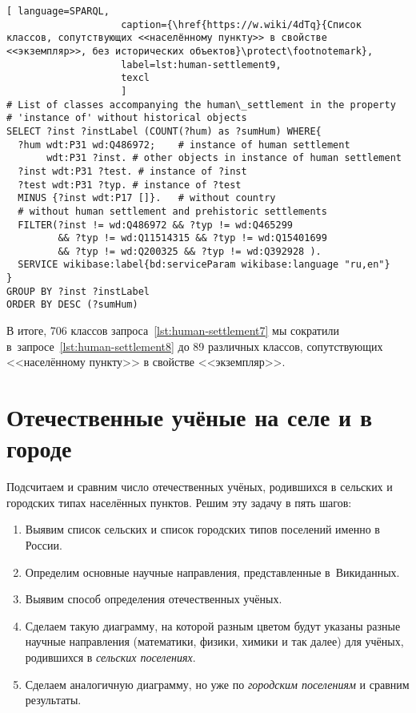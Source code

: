 \lstset{numbers=left, firstnumber=1, frame=single}
\begin{lstlisting}[ language=SPARQL, 
                    caption={\href{https://w.wiki/4dTq}{Cписок классов, сопутствующих <<населённому пункту>> в свойстве <<экземпляр>>, без исторических объектов}\protect\footnotemark},
                    label=lst:human-settlement9,
                    texcl 
                    ]
# List of classes accompanying the human\_settlement in the property
# 'instance of' without historical objects 
SELECT ?inst ?instLabel (COUNT(?hum) as ?sumHum) WHERE{
  ?hum wdt:P31 wd:Q486972;    # instance of human settlement
       wdt:P31 ?inst. # other objects in instance of human settlement
  ?inst wdt:P31 ?test. # instance of ?inst
  ?test wdt:P31 ?typ. # instance of ?test
  MINUS {?inst wdt:P17 []}.   # without country
  # without human settlement and prehistoric settlements
  FILTER(?inst != wd:Q486972 && ?typ != wd:Q465299 
         && ?typ != wd:Q11514315 && ?typ != wd:Q15401699 
         && ?typ != wd:Q200325 && ?typ != wd:Q392928 ). 
  SERVICE wikibase:label{bd:serviceParam wikibase:language "ru,en"}
}
GROUP BY ?inst ?instLabel
ORDER BY DESC (?sumHum)
\end{lstlisting}%

В итоге, 706 классов запроса~\ref{lst:human-settlement7} 
мы сократили в~запросе~\ref{lst:human-settlement8} 
до 89 различных классов, сопутствующих <<населённому пункту>> в свойстве <<экземпляр>>. 



\section{Отечественные учёные на селе и в городе}

Подсчитаем и сравним число отечественных учёных, родившихся в сельских и городских типах населённых пунктов. 
Решим эту задачу в пять шагов:
\begin{enumerate}
  \item Выявим список сельских и список городских типов поселений именно в России.
  \item Определим основные научные направления, представленные в~Викиданных.
  \item Выявим способ определения отечественных учёных.
  \item Сделаем такую диаграмму, на которой разным цветом будут указаны разные научные направления (математики, физики, химики и так далее) для учёных, родившихся в \emph{сельских поселениях}.
  \item Сделаем аналогичную диаграмму, но уже по \emph{городским поселениям} и сравним результаты.
\end{enumerate}


